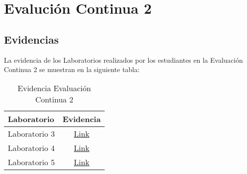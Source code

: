\chapter{Evalución Continua 2}
\newpage






\pagestyle{empty} %

\section{Evidencias}
La evidencia de los Laboratorios realizados por los estudiantes en la Evaluación Continua 2 se muestran en la siguiente tabla:

\begin{table}[h]
\centering
\begin{tabular}{l|c}
\hline
\textbf{Laboratorio} & 
\textbf{Evidencia} 
\\ \hline
Laboratorio 3 &
\href{https://drive.google.com/drive/folders/1knC3vddxB2suonXKBTW8DNcPRjSCXDQf?usp=sharing}{Link}
\\ \hline
Laboratorio 4 &
\href{https://drive.google.com/drive/folders/1Q-JOyVeBFSu1QmBeub5btlmi_CZmU5Wu?usp=sharing}{Link}
\\ \hline
Laboratorio 5  &
\href{https://drive.google.com/drive/folders/1q6vGtmIq2WdqRE3HXyVApg_rHB5SgpOs?usp=sharing}{Link}
\\ \hline
\end{tabular}
\caption{Evidencia Evaluación Continua 2}
\label{tab:evidencia_evaluacion_continua_2} %
\end{table}

